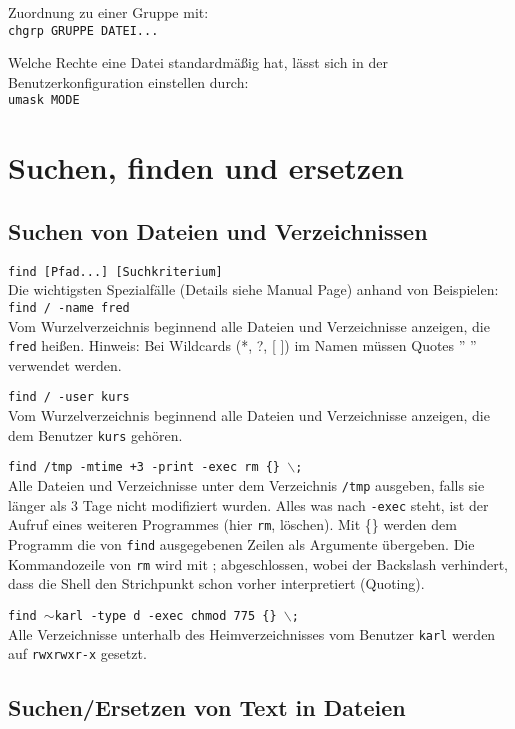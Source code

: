 \documentclass[11pt]{article}
\begin{document}
Zuordnung zu einer Gruppe mit:\\
\texttt{chgrp GRUPPE DATEI...}

Welche Rechte eine Datei standardmäßig hat, lässt sich in der
Benutzerkonfiguration einstellen durch:\\
\texttt{umask MODE}

\section{Suchen, finden und ersetzen}
\subsection{Suchen von Dateien und Verzeichnissen}
\texttt{find [Pfad...] [Suchkriterium]}\\

Die wichtigsten Spezialfälle (Details siehe Manual Page) anhand
von Beispielen:\\

\texttt{find / -name fred} \\
Vom Wurzelverzeichnis beginnend alle Dateien und Verzeichnisse
anzeigen, die \texttt{fred} heißen. Hinweis: Bei Wildcards (*, ?, [ ])
im Namen müssen Quotes '' '' verwendet werden.

\texttt{find / -user kurs} \\
Vom Wurzelverzeichnis beginnend alle Dateien und Verzeichnisse
anzeigen, die dem Benutzer \texttt{kurs} gehören.

\texttt{find /tmp -mtime +3 -print -exec rm \{\} $\backslash$;} \\
Alle Dateien und Verzeichnisse unter dem Verzeichnis \texttt{/tmp}
ausgeben, falls sie länger als 3 Tage nicht modifiziert wurden.
Alles was nach \texttt{-exec} steht, ist der Aufruf eines weiteren
Programmes (hier \texttt{rm}, löschen). Mit \{\} werden dem Programm
die von \texttt{find} ausgegebenen Zeilen als Argumente übergeben. Die
Kommandozeile von \texttt{rm} wird mit ; abgeschlossen, wobei der
Backslash verhindert, dass die Shell den Strichpunkt schon vorher
interpretiert (Quoting).

\texttt{find $\sim$karl -type d -exec chmod 775 \{\} $\backslash$;} \\
Alle Verzeichnisse unterhalb des Heimverzeichnisses vom Benutzer
\texttt{karl} werden auf \texttt{rwxrwxr-x} gesetzt.

\subsection{Suchen/Ersetzen von Text in Dateien} 
\end{document}
